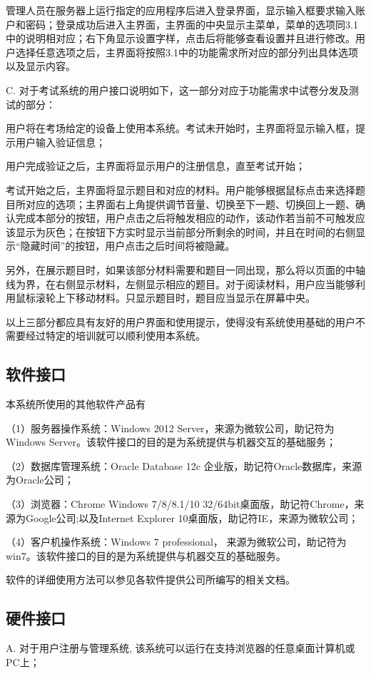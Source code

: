 管理人员在服务器上运行指定的应用程序后进入登录界面，显示输入框要求输入账户和密码；登录成功后进入主界面，主界面的中央显示主菜单，菜单的选项同3.1中的说明相对应；右下角显示设置字样，点击后将能够查看设置并且进行修改。用户选择任意选项之后，主界面将按照3.1中的功能需求所对应的部分列出具体选项以及显示内容。

C. 对于考试系统的用户接口说明如下，这一部分对应于功能需求中试卷分发及测试的部分：

用户将在考场给定的设备上使用本系统。考试未开始时，主界面将显示输入框，提示用户输入验证信息；

用户完成验证之后，主界面将显示用户的注册信息，直至考试开始；

考试开始之后，主界面将显示题目和对应的材料。用户能够根据鼠标点击来选择题目所对应的选项；主界面右上角提供调节音量、切换至下一题、切换回上一题、确认完成本部分的按钮，用户点击之后将触发相应的动作，该动作若当前不可触发应该显示为灰色；在按钮下方实时显示当前部分所剩余的时间，并且在时间的右侧显示“隐藏时间”的按钮，用户点击之后时间将被隐藏。

另外，在展示题目时，如果该部分材料需要和题目一同出现，那么将以页面的中轴线为界，在右侧显示材料，左侧显示相应的题目。对于阅读材料，用户应当能够利用鼠标滚轮上下移动材料。只显示题目时，题目应当显示在屏幕中央。

以上三部分都应具有友好的用户界面和使用提示，使得没有系统使用基础的用户不需要经过特定的培训就可以顺利使用本系统。

\subsection{软件接口}
本系统所使用的其他软件产品有

（1）服务器操作系统：Windows 2012 Server，来源为微软公司，助记符为Windows Server。该软件接口的目的是为系统提供与机器交互的基础服务；

（2）数据库管理系统：Oracle Database 12c 企业版，助记符Oracle数据库，来源为Oracle公司；

（3）浏览器：Chrome Windows 7/8/8.1/10 32/64bit桌面版，助记符Chrome，来源为Google公司;以及Internet Explorer 10桌面版，助记符IE，来源为微软公司；

（4）客户机操作系统：Windows 7 professional， 来源为微软公司，助记符为win7。该软件接口的目的是为系统提供与机器交互的基础服务。

软件的详细使用方法可以参见各软件提供公司所编写的相关文档。

\subsection{硬件接口}
A. 对于用户注册与管理系统, 该系统可以运行在支持浏览器的任意桌面计算机或PC上；

